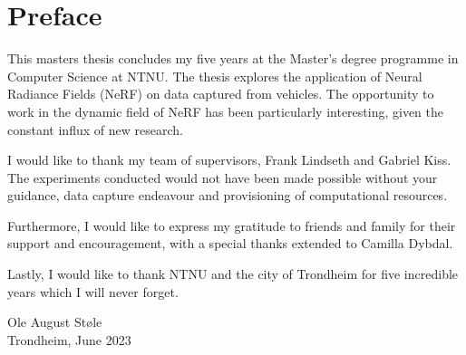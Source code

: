 \chapter*{Preface}

This masters thesis concludes my five years at the Master’s degree programme in Computer Science at NTNU. The thesis explores the application of Neural Radiance Fields (NeRF) on data captured from vehicles. The opportunity to work in the dynamic field of NeRF has been particularly interesting, given the constant influx of new research.

I would like to thank my team of supervisors, Frank Lindseth and Gabriel Kiss. The experiments conducted would not have been made possible without your guidance, data capture endeavour and provisioning of computational resources.

Furthermore, I would like to express my gratitude to friends and family for their support and encouragement, with a special thanks extended to Camilla Dybdal. 

Lastly, I would like to thank NTNU and the city of Trondheim for five incredible years which I will never forget.

\vspace{2.5cm}
\begin{center}
    Ole August Støle \\
    Trondheim, June 2023
\end{center}